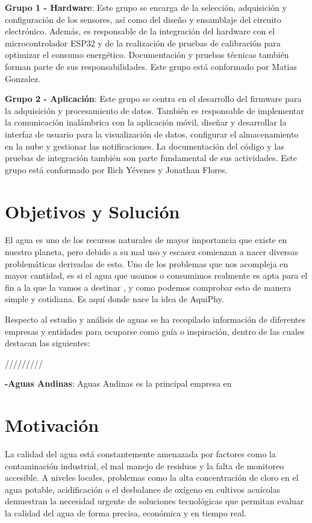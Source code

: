 \documentclass{article}
\begin{document}
\textbf{Grupo 1 - Hardware}:
Este grupo se encarga de la selección, adquisición y configuración de los sensores, así como del diseño y ensamblaje del circuito electrónico. Además, es responsable de la integración del hardware con el microcontrolador ESP32 y de la realización de pruebas de calibración para optimizar el consumo energético. Documentación y pruebas técnicas también forman parte de sus responsabilidades. Este grupo está conformado por Matias Gonzalez.

\textbf{Grupo 2 - Aplicación}:
Este grupo se centra en el desarrollo del firmware para la adquisición y procesamiento de datos. También es responsable de implementar la comunicación inalámbrica con la aplicación móvil, diseñar y desarrollar la interfaz de usuario para la visualización de datos, configurar el almacenamiento en la nube y gestionar las notificaciones. La documentación del código y las pruebas de integración también son parte fundamental de sus actividades. Este grupo está conformado por Ilich Yévenes y Jonathan Flores.
\section{Objetivos y Solución}

El agua es uno de los recursos naturales de mayor importancia que existe en nuestro planeta, pero debido a su mal uso y escasez comienzan a nacer diversas problemáticas derivadas de esto. Uno de los problemas que nos acompleja en mayor cantidad, es si el agua que usamos o consumimos realmente es apta para el fin a la que la vamos a destinar , y como podemos comprobar esto de manera simple y cotidiana. Es aquí donde nace la idea de AquiPhy.

Respecto al estudio y análisis de aguas se ha recopilado información de diferentes empresas y entidades para ocuparse como guía o inspiración, dentro de las cuales destacan las siguientes:

/////////

\textbf{-Aguas Andinas}: Aguas Andinas es la principal empresa en  

\section{Motivación}

La calidad del agua está constantemente amenazada por factores como la contaminación industrial, el mal manejo de residuos y la falta de monitoreo accesible. A niveles locales, problemas como la alta concentración de cloro en el agua potable, acidificación o el desbalance de oxígeno en cultivos acuícolas demuestran la necesidad urgente de soluciones tecnológicas que permitan evaluar la calidad del agua de forma precisa, económica y en tiempo real.
\end{document}

